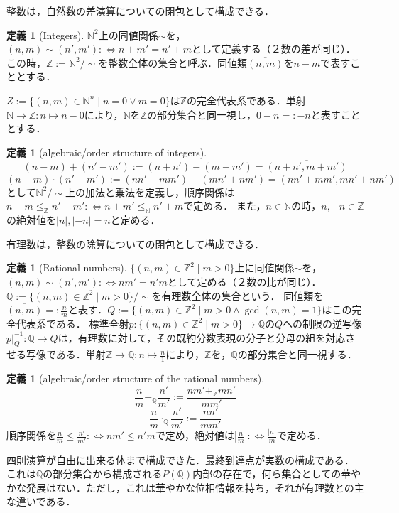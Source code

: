 \documentclass[uplatex, 12pt, dvipdfmx]{jsreport}
\theoremstyle{definition}
\newtheorem{definition}[theorem]{定義}
\theoremstyle{StatementsWithStar}
\theoremstyle{StatementsWithStar2}
\theoremstyle{StatementsWithStar3}
\theoremstyle{StatementsWithCCirc}
\theoremstyle{definition}
\begin{document}
整数は，自然数の差演算についての閉包として構成できる．
\begin{definition}[Integers]
    $\mathbb{N}^2$上の同値関係$\sim$を，$(n,m)\sim (n',m'):\Leftrightarrow n+m'=n'+m$として定義する（２数の差が同じ）．この時，$\mathbb{Z}:=\mathbb{N}^2/\sim$を整数全体の集合と呼ぶ．同値類$\overline{(n,m)}$を$n-m$で表すこととする．

    $Z:=\{(n,m)\in\mathbb{N}^n\mid n=0\lor m=0\}$は$\mathbb{Z}$の完全代表系である．単射$\mathbb{N}\to\mathbb{Z}:n\mapsto n-0$により，$\mathbb{N}$を$\mathbb{Z}$の部分集合と同一視し，$0-n=:-n$と表すこととする．
\end{definition}

\begin{definition}[algebraic/order structure of integers]
    \[ (n-m)+(n'-m'):= (n+n')-(m+m')=\overline{(n+n',m+m')} \]
    \[ (n-m)\cdot (n'-m'):=(nn'+mm')-(mn'+nm')=\overline{(nn'+mm',mn'+nm')} \]
    として$\mathbb{N}^2/\sim$上の加法と乗法を定義し，順序関係は$n-m\le_\mathbb{Z} n'-m' :\Leftrightarrow n+m'\le_\mathbb{N} n'+m$で定める．
    また，$n\in\mathbb{N}$の時，$n,-n\in\mathbb{Z}$の絶対値を$|n|,|-n|=n$と定める．
\end{definition}

有理数は，整数の除算についての閉包として構成できる．
\begin{definition}[Rational numbers]
    $\{ (n,m)\in\mathbb{Z}^2\mid m>0 \}$上に同値関係$\sim$を，$(n,m)\sim (n',m'):\Leftrightarrow nm'=n'm$として定める（２数の比が同じ）．$\mathbb{Q}:=\{ (n,m)\in\mathbb{Z}^2\mid m>0 \}/\sim$を有理数全体の集合という．
    同値類を$\overline{(n,m)}=:\frac{n}{m}$と表す．$Q:=\{(n,m)\in\mathbb{Z}^2\mid m>0\land \gcd(n,m)=1\}$はこの完全代表系である．
    標準全射$p:\{ (n,m)\in\mathbb{Z}^2\mid m>0 \}\to\mathbb{Q}$の$Q$への制限の逆写像$p|_Q^{-1}:\mathbb{Q}\to Q$は，有理数に対して，その既約分数表現の分子と分母の組を対応させる写像である．単射$\mathbb{Z}\to\mathbb{Q}:n\mapsto\frac{n}{1}$により，$\mathbb{Z}$を，$\mathbb{Q}$の部分集合と同一視する．
\end{definition}

\begin{definition}[algebraic/order structure of the rational numbers]
    \[ \frac{n}{m} +_\mathbb{Q} \frac{n'}{m'} := \frac{nm'+_\mathbb{Z}mn'}{mm'} \]
    \[ \frac{n}{m}\cdot_\mathbb{Q}\frac{n'}{m'} := \frac{nn'}{mm'} \]
    順序関係を$\frac{n}{m}\le\frac{n'}{m'}:\Leftrightarrow nm'\le n'm$で定め，絶対値は$\left| \frac{n}{m} \right|:\Leftrightarrow \frac{|n|}{m}$で定める．
\end{definition}
四則演算が自由に出来る体まで構成できた．最終到達点が実数の構成である．
これは$\mathbb{Q}$の部分集合から構成される$P(\mathbb{Q})$内部の存在で，何ら集合としての華やかな発展はない．ただし，これは華やかな位相情報を持ち，それが有理数との主な違いである．
\end{document}
